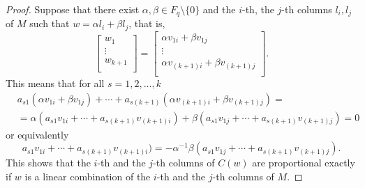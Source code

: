 \documentclass[10pt,a4paper]{amsart}
\begin{document}
\begin{proof}
\noindent
Suppose that there exist $\alpha, \beta\in F_q\setminus\{0\}$ and the $i$-th, the  $j$-th columns $l_i, l_j$ of $M$ such that $w=\alpha l_i+\beta l_j$, that is,  $$\left[
\begin{array}{cccc}
w_1\\
\vdots\\
w_{k+1}\\
\end{array}
\right]=\left[
\begin{array}{cccc}
\alpha v_{1i}+\beta v_{1j}\\
\vdots\\
\alpha v_{(k+1)i}+\beta v_{(k+1)j}\\
\end{array}
\right].$$
This means that for all $s=1,2, \dots, k$
\begin{align*}
&a_{s1}(\alpha v_{1i}+\beta v_{1j})+ \cdots +a_{s(k+1)}(\alpha v_{(k+1)i}+\beta v_{(k+1)j})=\\
&=\alpha( a_{s1}v_{1i}+\cdots+ a_{s(k+1)}v_{(k+1)i})        +     \beta (a_{s1}v_{1j}+ \cdots +a_{s(k+1)}v_{(k+1)j})=
0\end{align*}
or equivalently $$a_{s1}v_{1i}+\cdots+ a_{s(k+1)}v_{(k+1)i})=-\alpha^{-1}\beta(a_{s1}v_{1j}+ \cdots +a_{s(k+1)}v_{(k+1)j}).$$
This shows that the $i$-th and the  $j$-th columns of $C(w)$ are proportional exactly if $w$ is a linear combination of the $i$-th and the  $j$-th columns of $M$.
 \end{proof}
\end{document}
